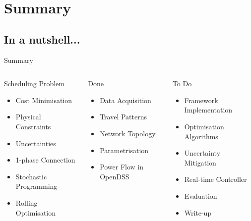 \documentclass[handout]{beamer}
\begin{document}
\section{Summary}

\subsection*{In a nutshell...}

\begin{frame}{Summary}
	\begin{columns}[T]
		\begin{column}{4.1cm}
			\textcolor{UOEpink}{Scheduling Problem}
			\begin{itemize}
				\item Cost Minimisation
				\item Physical Constraints
				\item Uncertainties
				\item 1-phase Connection
				\item Stochastic Programming
				\item Rolling Optimisation
			\end{itemize}
		\end{column}
	\pause
		\begin{column}{4cm}
			\textcolor{UOEgreen}{Done}
			\begin{itemize}
				\item Data Acquisition
				\item Travel Patterns
				\item Network Topology
				\item Parametrisation
				\item Power Flow in OpenDSS
			\end{itemize}
		\end{column}
	\pause
		\begin{column}{4cm}
			\textcolor{UOEyellow}{To Do}
			\begin{itemize}
				\item Framework Implementation
				\item Optimisation Algorithms
				\item Uncertainty Mitigation
				\item Real-time Controller
				\item Evaluation
				\item Write-up
			\end{itemize}
		\end{column}
	\end{columns}
\end{frame}
\end{document}
